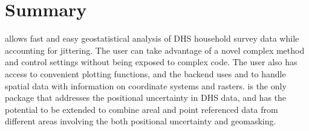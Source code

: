 \section{Summary}
 allows fast and easy geostatistical analysis of DHS household survey data while accounting for jittering. The user can take advantage of a novel complex method \citep{altay2022accounting,altay2022covariates} and control settings without being exposed to complex code. The user also has access to convenient plotting functions, and the backend uses  and  to handle spatial data with information on coordinate systems and rasters.  is the only package that  addresses the positional uncertainty in DHS data, and has the potential to be extended to combine  areal and point referenced data from different areas involving the both positional uncertainty and geomasking.

